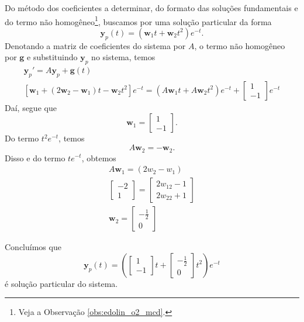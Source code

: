 \begin{resol}
  Do método dos coeficientes a determinar, do formato das soluções fundamentais e do termo não homogêneo\footnote{Veja a Observação \ref{obs:edolin_o2_mcd}.}, buscamos por uma solução particular da forma
  \begin{equation}
    \pmb{y}_p(t) = (\pmb{w}_1t + \pmb{w}_2t^2)e^{-t}.
  \end{equation}
  Denotando a matriz de coeficientes do sistema por $A$, o termo não homogêneo por $\pmb{g}$ e substituindo $\pmb{y}_p$ no sistema, temos
  \begin{gather}
    \pmb{y}_p' = A\pmb{y}_p + \pmb{g}(t) \\
    \left[\pmb{w}_1 + (2\pmb{w}_2 - \pmb{w}_1)t - \pmb{w}_2t^2\right]e^{-t} = (A\pmb{w}_1t + A\pmb{w}_2t^2)e^{-t} +
    \begin{bmatrix}
      1 \\
      -1
    \end{bmatrix}e^{-t}
  \end{gather}
  Daí, segue que
  \begin{equation}
    \pmb{w}_1 =
    \begin{bmatrix}
      1 \\
      -1
    \end{bmatrix}.
  \end{equation}
  Do termo $t^2e^{-t}$, temos
  \begin{equation}
    A\pmb{w}_2 = -\pmb{w}_2.
  \end{equation}
  Disso e do termo $te^{-t}$, obtemos
  \begin{gather}
    A\pmb{w}_1 = (2w_2 - w_1) \\
    \begin{bmatrix}
      -2 \\
      1
    \end{bmatrix} =
    \begin{bmatrix}
      2w_{12}-1 \\
      2w_{22}+1
    \end{bmatrix} \\
    \pmb{w}_2 =
    \begin{bmatrix}
      -\frac{1}{2} \\
      0
    \end{bmatrix}
  \end{gather}

  Concluímos que
  \begin{equation}
    \pmb{y}_p(t) = \left(
    \begin{bmatrix}
      1 \\
      -1
    \end{bmatrix}t +
    \begin{bmatrix}
      -\frac{1}{2} \\
      0
    \end{bmatrix}t^2\right)e^{-t}
  \end{equation}
  é solução particular do sistema.
\end{resol}


